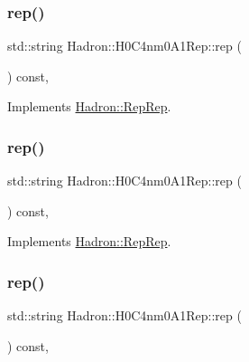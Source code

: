 \subsubsection{\texorpdfstring{rep()}{rep()}\hspace{0.1cm}{\footnotesize\ttfamily [1/3]}}
{\footnotesize\ttfamily std\+::string Hadron\+::\+H0\+C4nm0\+A1\+Rep\+::rep (\begin{DoxyParamCaption}{ }\end{DoxyParamCaption}) const\hspace{0.3cm}{\ttfamily [inline]}, {\ttfamily [virtual]}}



Implements \mbox{\hyperlink{structHadron_1_1RepRep_ab3213025f6de249f7095892109575fde}{Hadron\+::\+Rep\+Rep}}.

\mbox{\label{structHadron_1_1H0C4nm0A1Rep_a30712f6aadf0e0304142526d08c2822e}} 
\subsubsection{\texorpdfstring{rep()}{rep()}\hspace{0.1cm}{\footnotesize\ttfamily [2/3]}}
{\footnotesize\ttfamily std\+::string Hadron\+::\+H0\+C4nm0\+A1\+Rep\+::rep (\begin{DoxyParamCaption}{ }\end{DoxyParamCaption}) const\hspace{0.3cm}{\ttfamily [inline]}, {\ttfamily [virtual]}}



Implements \mbox{\hyperlink{structHadron_1_1RepRep_ab3213025f6de249f7095892109575fde}{Hadron\+::\+Rep\+Rep}}.

\mbox{\label{structHadron_1_1H0C4nm0A1Rep_a30712f6aadf0e0304142526d08c2822e}} 
\subsubsection{\texorpdfstring{rep()}{rep()}\hspace{0.1cm}{\footnotesize\ttfamily [3/3]}}
{\footnotesize\ttfamily std\+::string Hadron\+::\+H0\+C4nm0\+A1\+Rep\+::rep (\begin{DoxyParamCaption}{ }\end{DoxyParamCaption}) const\hspace{0.3cm}{\ttfamily [inline]}, {\ttfamily [virtual]}}



